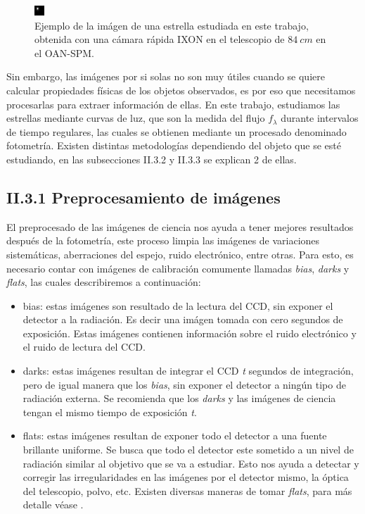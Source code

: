 \begin{figure}[h!]
  \centering
    \includegraphics[scale=8]{./figures/wasp74b.png}
   \caption{Ejemplo de la imágen de una estrella estudiada en este trabajo, obtenida con una cámara rápida IXON en el telescopio de $84~cm$ en el OAN-SPM.}
    \label{fig_2_5_wasp74b}
\end{figure}

Sin embargo, las imágenes por si solas no son muy útiles cuando se quiere calcular propiedades físicas de los objetos observados, es por eso que necesitamos procesarlas para extraer información de ellas. En este trabajo, estudiamos las estrellas mediante curvas de luz, que son la medida del flujo $f_{\lambda}$ durante intervalos de tiempo regulares, las cuales se obtienen mediante un procesado denominado fotometría. Existen distintas metodologías dependiendo del objeto que se esté estudiando, en las subsecciones II.3.2 y II.3.3 se explican 2 de ellas.

\subsection*{II.3.1 Preprocesamiento de imágenes}

El preprocesado de las imágenes de ciencia nos ayuda a tener mejores resultados después de la fotometría, este proceso limpia las imágenes de variaciones sistemáticas, aberraciones del espejo, ruido electrónico, entre otras. Para esto, es necesario contar con imágenes de calibración comumente llamadas \textit{bias}, \textit{darks} y \textit{flats}, las cuales describiremos a continuación:

\begin{itemize}
  \item bias: estas imágenes son resultado de la lectura del CCD, sin exponer el detector a la radiación. Es decir una imágen tomada con cero segundos de exposición. Estas imágenes contienen información sobre el ruido electrónico y el ruido de lectura del CCD. 
  \item darks: estas imágenes resultan de integrar el CCD \textit{t} segundos de integración, pero de igual manera que los \textit{bias}, sin exponer el detector a ningún tipo de radiación externa. Se recomienda que los \textit{darks} y las imágenes de ciencia tengan el mismo tiempo de exposición \textit{t}.
  \item flats: estas imágenes resultan de exponer todo el detector a una fuente brillante uniforme. Se busca que todo el detector este sometido a un nivel de radiación similar al objetivo que se va a estudiar. Esto nos ayuda a detectar  y corregir las irregularidades en las imágenes por el detector mismo, la óptica del telescopio, polvo, etc. Existen diversas maneras de tomar \textit{flats}, para más detalle véase \cite{chromey1996special}.
\end{itemize}

